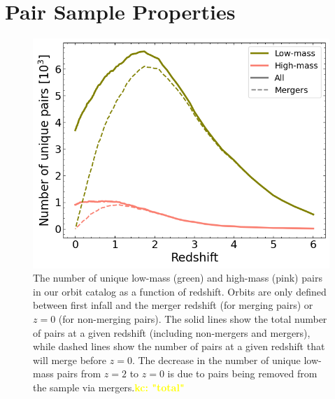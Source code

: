 \documentclass[twocolumn,linenumbers]{aastex631}
\newcommand{\kc}[1]{\textcolor{yellow}{\textbf{kc: #1}} }
\begin{document}
\section{Pair Sample Properties}\label{sec:pairprops}
\begin{figure}[tb]
    \begin{center}
    \includegraphics[width=\columnwidth]{plots/bet-on-it/6_paircount.png}
    \caption{The number of unique low-mass (green) and high-mass (pink) pairs in our orbit catalog as a function of redshift. Orbits are only defined between first infall and the merger redshift (for merging pairs) or $z=0$ (for non-merging pairs). 
    The solid lines show the total number of pairs at a given redshift (including non-mergers and mergers), while dashed lines show the number of pairs at a given redshift that will merge before $z=0$.
    The decrease in the number of unique low-mass pairs from $z=2$ to $z=0$ is due to pairs being removed from the sample via mergers.\kc{"total"}
    }
    \label{fig:numorbits}
    \end{center}
\end{figure}
\end{document}
